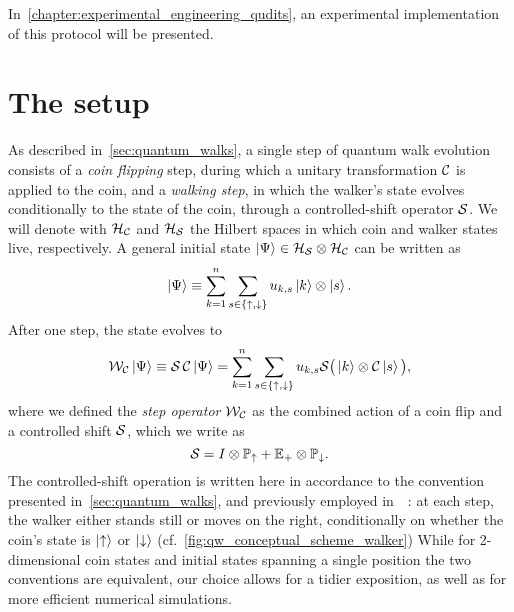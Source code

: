 In~\cref{chapter:experimental_engineering_qudits}, an experimental implementation of this protocol will be presented.

\section{The setup}
\label{sec:qw_setup}

As described in~\cref{sec:quantum_walks}, a single step of quantum walk evolution consists of a \emph{coin flipping} step, during which a unitary transformation ${\mathcal{C}}$ is applied to the coin, and a \emph{walking step}, in which the walker's state evolves conditionally to the state of the coin, through a controlled-shift operator ${\mathcal{S}}$.
We will denote with ${{\mathcal{H}}_{\mathcal{C}}}$ and ${{\mathcal{H}}_{\mathcal{S}}}$ the Hilbert spaces in which coin and walker states live, respectively.
A general initial state $\ket\Psi\in{{\mathcal{H}}_{\mathcal{S}}}\otimes{{\mathcal{H}}_{\mathcal{C}}}$ can be written as
\begin{equation}
	\ket\Psi \equiv \sum_{k=1}^n \sum_{s\in\{\uparrow,\downarrow\}}
	u_{k,s} \ket{k} \otimes \ket{s}.
	\label{eq:initial_state}
\end{equation}
After one step, the state evolves to
\begin{equation}
	\mathcal W_{\mathcal C} \ket\Psi \equiv
	\mathcal S \,\mathcal C \ket\Psi
	= \sum_{k=1}^n \sum_{s\in\{\uparrow,\downarrow\}}
	u_{k,s}
	\mathcal S \big( \ket{k} \otimes \mathcal C \ket{s} \big),
	\label{eq:step_operator_definition}
\end{equation}
where we defined the \emph{step operator} ${\mathcal{W}}_{{\mathcal{C}}}$ as the combined action of a coin flip and a controlled shift ${\mathcal{S}}$, which we write as
\begin{equation}
	{\mathcal{S}} =
    I\otimes \mathbb{P}_\uparrow + \mathbb{E}_+\otimes\mathbb{P}_\downarrow.
	\label{eq:controlled_shift_operator}
\end{equation}
The controlled-shift operation is written here in accordance to the convention presented in~\cref{sec:quantum_walks}, and previously employed in~~\cite{hoyer2009faster, montero2013unidirectional,montero2015quantum}: at each step, the walker either stands still or moves on the right, conditionally on whether the coin's state is $\ket{\uparrow}$ or $\ket{\downarrow}$ (cf.~\cref{fig:qw_conceptual_scheme_walker})
While for 2-dimensional coin states and initial states spanning a single position the two conventions are equivalent, our choice allows for a tidier exposition, as well as for more efficient numerical simulations.

